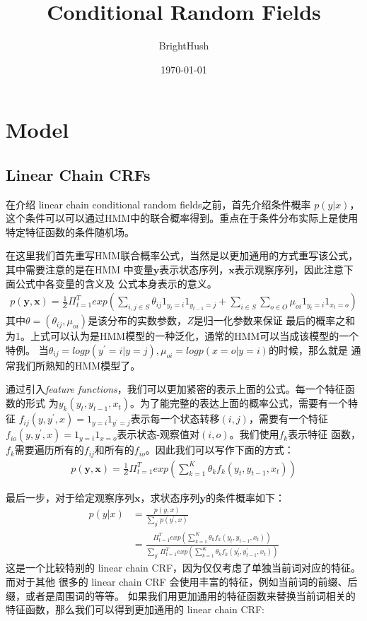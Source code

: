 \documentclass[UTF8]{ctexart}
\title{Conditional Random Fields}
\author{BrightHush}
\date{\today}
\begin{document}
\maketitle
\tableofcontents

\pagestyle{fancy}
\cfoot{\thepage}

\newcommand{\figref}[1]{\figurename~\ref{#1}}

\section{Model}

\subsection{Linear Chain CRFs}
在介绍 linear chain conditional random fields之前，首先介绍条件概率 $p(y|x)$，
这个条件可以可以通过HMM中的联合概率得到。重点在于条件分布实际上是使用特定特征函数的条件随机场。
\par
在这里我们首先重写HMM联合概率公式，当然是以更加通用的方式重写该公式，其中需要注意的是在HMM
中变量$\textbf{y}$表示状态序列，$\textbf{x}$表示观察序列，因此注意下面公式中各变量的含义及
公式本身表示的意义。
\begin{align}
p(\textbf{y}, \textbf{x}) = \frac{1}{Z} \Pi_{t=1}^T exp
\left( 
\sum_{i,j \in S}\theta_{ij}1_{y_t=i}1_{y_{t-1}=j} + 
\sum_{i \in S} \sum_{o \in O} \mu_{oi} 1_{y_t=i} 1_{x_t=o}
\right)
\end{align}
其中$\theta = ( \theta_{ij}, \mu_{oi} )$是该分布的实数参数，$Z$是归一化参数来保证
最后的概率之和为1。上式可以认为是HMM模型的一种泛化，通常的HMM可以当成该模型的一个特例。
当$\theta_{ij} = log p(y^{'}=i|y=j), \mu_{oi} = log p(x=o|y=i)$的时候，那么就是
通常我们所熟知的HMM模型了。

\par
通过引入\textit{feature functions}，我们可以更加紧密的表示上面的公式。每一个特征函数的形式
为$y_k(y_t, y_{t-1}, x_t)$。为了能完整的表达上面的概率公式，需要有一个特征
$f_{ij}(y, y^{'}, x)=1_{y=i}1_{y^{'}=j}$表示每一个状态转移$(i, j)$，需要有一个特征
$f_{io}(y, y^{'}, x)=1_{y=i}1_{x=o}$表示状态-观察值对$(i, o)$。我们使用$f_k$表示特征
函数，$f_k$需要遍历所有的$f_{ij}$和所有的$f_{io}$。因此我们可以写作下面的方式：
\begin{align}
p(\textbf{y}, \textbf{x}) = \frac{1}{Z} \Pi_{t=1}^T exp
( \sum_{k=1}^K \theta_k f_k(y_t, y_{t-1}, x_t) )
\end{align}

\par
最后一步，对于给定观察序列$\textbf{x}$，求状态序列$\textbf{y}$的条件概率如下：
\begin{align}
p(y|x) &= \frac{p(y, x)}{\sum_{y^{'}}p(y^{'}, x)}
\\
&= \frac{\Pi_{t=1}^T exp(\sum_{k=1}^K \theta_k f_k(y_t, y_{t-1}, x_t))}
{\sum_{y^{'}} \Pi_{t=1}^T exp(\sum_{k=1}^K \theta_k f_k(y_t^{'}, y_{t-1}^{'}, x_t)) }
\end{align}
这是一个比较特别的 linear chain CRF，因为仅仅考虑了单独当前词对应的特征。而对于其他
很多的 linear chain CRF 会使用丰富的特征，例如当前词的前缀、后缀，或者是周围词的等等。
如果我们用更加通用的特征函数来替换当前词相关的特征函数，那么我们可以得到更加通用的 linear 
chain CRF:
\end{document}
